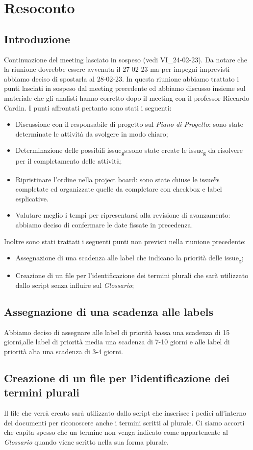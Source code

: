 \section{Resoconto}
\subsection{Introduzione}
Continuazione del meeting lasciato in sospeso (vedi VI\_24-02-23).
Da notare che la riunione dovrebbe essere avvenuta il 27-02-23 ma per impegni imprevisti abbiamo deciso di spostarla al 28-02-23.
In questa riunione abbiamo trattato i punti lasciati in sospeso dal meeting precedente ed abbiamo discusso insieme sul materiale che
gli analisti hanno corretto dopo il meeting con il professor Riccardo Cardin.
I punti affrontati pertanto sono stati i seguenti:
\begin{itemize}
    \item Discussione con il responsabile di progetto sul \textit{Piano di Progetto}: sono state determinate le attività da svolgere in modo chiaro;
    \item Determinazione delle possibili issue\textsubscript{g}s:sono state create le issue\textsubscript{g} da risolvere per il completamento delle attività;
    \item Ripristinare l'ordine nella project board: sono state chiuse le issue\textsuperscript{g}s completate ed organizzate quelle da completare con checkbox e label esplicative.
    \item Valutare meglio i tempi per ripresentarsi alla revisione di avanzamento: abbiamo deciso di confermare le date fissate in precedenza.
    \end{itemize}
Inoltre sono stati trattati i seguenti punti non previsti nella riunione precedente:
\begin{itemize}
\item Assegnazione di una scadenza alle label che indicano la priorità delle issue\textsubscript{g};
\item Creazione di un file per l'identificazione dei termini plurali che sarà utilizzato dallo script senza influire sul \textit{Glossario};
\end{itemize}
\subsection{Assegnazione di una scadenza alle labels}
Abbiamo deciso di assegnare alle label di priorità bassa una scadenza di 15 giorni,alle label di priorità media una scadenza di 7-10 giorni e alle 
label di priorità alta una scadenza di 3-4 giorni.
\subsection{Creazione di un file per l'identificazione dei termini plurali}
Il file che verrà creato sarà utilizzato dallo script che inserisce i pedici all'interno dei documenti per riconoscere anche i termini scritti al 
plurale. Ci siamo accorti che capita spesso che un termine non venga indicato come appartenente al \textit{Glossario} quando viene scritto nella 
sua forma plurale.

